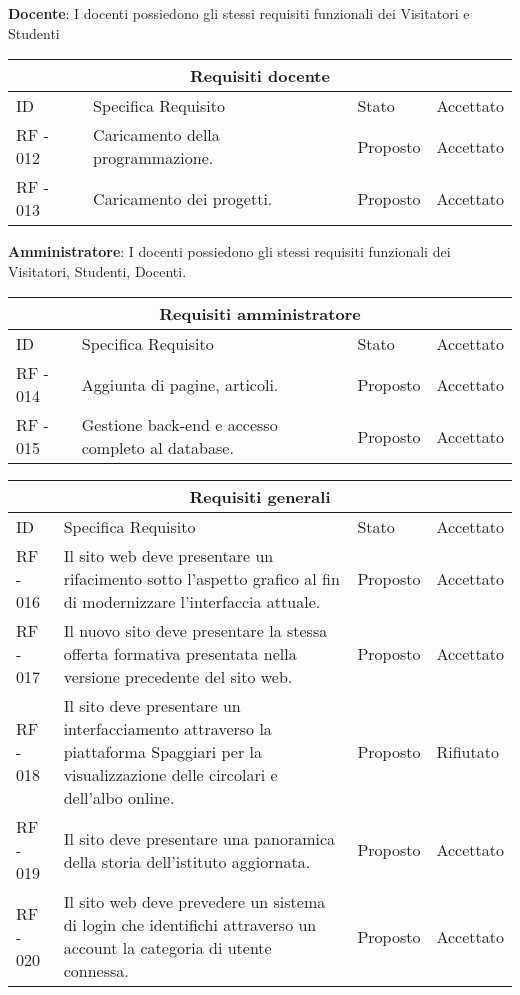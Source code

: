 \documentclass{article}
\begin{document}
	\vspace{2mm}
	\item \textbf{Docente}: I docenti possiedono gli stessi requisiti funzionali dei Visitatori e Studenti
	\begin{tabular}{ |p{1cm}|p{4cm}|p{3cm}|p{2cm}|  }
		\hline
		\multicolumn{4}{|c|}{Requisiti docente} \\
		\hline
		ID& Specifica Requisito &Stato&Accettato\\
		\hline
		RF - 012& Caricamento della programmazione. &Proposto&Accettato\\
		\hline
		RF - 013& Caricamento dei progetti. &Proposto&Accettato\\
		\hline
	\end{tabular}
	\vspace{2mm}
	\item \textbf{Amministratore}: I docenti possiedono gli stessi requisiti funzionali dei Visitatori, Studenti, Docenti.
	\begin{tabular}{ |p{1cm}|p{4cm}|p{3cm}|p{2cm}|  }
		\hline
		\multicolumn{4}{|c|}{Requisiti amministratore} \\
		\hline
		ID& Specifica Requisito &Stato&Accettato\\
		\hline
		RF - 014& Aggiunta di pagine, articoli. &Proposto&Accettato\\
		\hline
		RF - 015& Gestione back-end e accesso completo al database. &Proposto&Accettato\\
		\hline
	\end{tabular}
	\begin{tabular}{ |p{1cm}|p{4cm}|p{3cm}|p{2cm}|  }
		\hline
		\multicolumn{4}{|c|}{Requisiti generali} \\
		\hline
		ID& Specifica Requisito &Stato&Accettato\\
		\hline
		RF - 016& Il sito web deve presentare un rifacimento sotto l'aspetto grafico al fin di modernizzare l'interfaccia attuale. &Proposto&Accettato\\
		\hline
		RF - 017& Il nuovo sito deve presentare la stessa offerta formativa presentata nella versione precedente del sito web. &Proposto&Accettato\\
		\hline
		RF - 018& Il sito deve presentare un interfacciamento attraverso la piattaforma Spaggiari per la visualizzazione delle circolari e dell'albo online. &Proposto&Rifiutato\\
		\hline
		RF - 019& Il sito deve presentare una panoramica della storia dell'istituto aggiornata. &Proposto&Accettato\\
		\hline
		RF - 020& Il sito web deve prevedere un sistema di login che identifichi attraverso un account la categoria di utente connessa. &Proposto&Accettato\\
		\hline
	\end{tabular}
\end{document}

